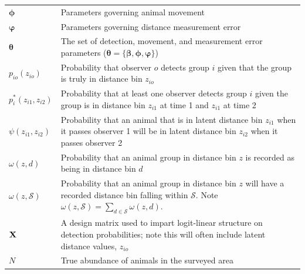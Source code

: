 \documentclass[aoas,preprint]{imsart}
\numberwithin{equation}{section}
\theoremstyle{plain}
\begin{document}
\begin{table}[ht]
\begin{tabular}{p{2cm}p{13cm}}
  $\boldsymbol{\phi}$ & Parameters governing animal movement \\
  $\boldsymbol{\varphi}$ & Parameters governing distance measurement error \\
  $\boldsymbol{\theta}$ & The set of detection, movement, and measurement error parameters ($\boldsymbol{\theta} = \{ \boldsymbol{\beta},\boldsymbol{\phi},\boldsymbol{\varphi} \}$) \\
  $p_{io}(z_{io})$ & Probability that observer $o$ detects group $i$ given that the group is truly in distance bin $z_{io}$\\
  $p_i^*(z_{i1},z_{i2})$ & Probability that at least one observer detects group $i$ given the group is in distance bin $z_{i1}$ at time 1 and $z_{i1}$ at time 2\\
  $\psi(z_{i1},z_{i2})$ & Probability that an animal that is in latent distance bin $z_{i1}$ when it passes observer 1 will be in latent distance bin $z_{i2}$ when it passes observer 2 \\
  $\omega(z,d)$ & Probability that an animal group in distance bin $z$ is recorded as being in distance bin $d$ \\
  $\omega(z,\mathcal{S})$ & Probability that an animal group in distance bin $z$ will have a recorded distance bin falling within $\mathcal{S}$.  Note $\omega(z,\mathcal{S}) = \sum_{d \in \mathcal{S}} \omega(z,d)$. \\
  ${\bf X}$ & A design matrix used to impart logit-linear structure on detection probabilities; note this will often include latent distance values, $z_{io}$  \\
  $N$ & True abundance of animals in the surveyed area \\
\hline
\end{tabular}
\\
\end{table}
\end{document}
